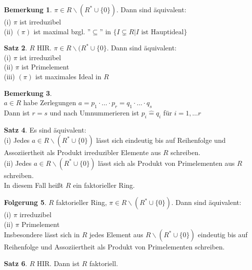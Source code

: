 \documentclass[10pt,a4paper,numbers=endperiod]{scrreprt}
\theoremstyle{definition}
\newtheorem{satz}{Satz}[section]
\newtheorem{bem}[satz]{Bemerkung}
\newtheorem{folg}[satz]{Folgerung}
\begin{document}
\begin{bem}
	$\pi \in R \backslash (R^* \cup \{0\})$. Dann sind äquivalent:\\
	(i) $\pi$ ist irreduzibel\\
	(ii) $(\pi)$ ist maximal bzgl. ''$\subseteq$'' in $\{I \subsetneq R| I \text{ ist Hauptideal}\}$
\end{bem}

\begin{satz}
	$R$ HIR. $\pi \in R \backslash (R^* \cup \{0\}$. Dann sind äquivalent:\\
	(i) $\pi$ ist irreduzibel\\
	(ii) $\pi$ ist Primelement\\
	(iii) $(\pi)$ ist maximales Ideal in $R$
\end{satz}

\begin{bem}
	$ $\\
	$a \in R$ habe Zerlegungen $a = p_1 \cdot \ldots \cdot p_r = q_1 \cdot \ldots \cdot q_s$\\
	Dann ist $r = s$ und nach Umnummerieren ist $p_i \hat{=} q_i$ für $i = 1, \ldots r$ 
\end{bem}

\begin{satz}
	Es sind äquivalent:\\
	(i) Jedes $a \in R \backslash (R^* \cup \{0\})$ lässt sich eindeutig bis auf Reihenfolge und Assoziiertheit als Produkt irreduzibler Elemente aus $R$ schreiben.\\
	(ii) Jedes $a \in R \backslash (R^* \cup \{0\})$ lässt sich als Produkt von Primelementen aus $R$ schreiben.\\
	In diesem Fall heißt $R$ ein faktorieller Ring.
\end{satz}

\begin{folg}
	$R$ faktorieller Ring, $\pi \in R \backslash (R^* \cup \{0\})$. Dann sind äquivalent:\\
	(i) $\pi$ irreduzibel\\
	(ii) $\pi$ Primelement\\
	Insbesondere lässt sich in $R$ jedes Element aus $R \backslash (R^* \cup \{0\})$ eindeutig bis auf Reihenfolge und Assoziiertheit als Produkt von Primelementen schreiben. 
\end{folg}

\begin{satz}
	$R$ HIR. Dann ist $R$ faktoriell.
\end{satz}
\end{document}
